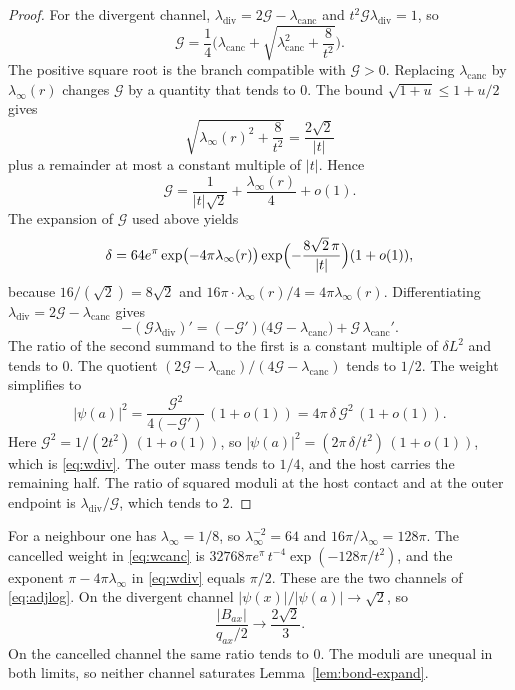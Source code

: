 \begin{proof}
For the divergent channel,
\(\lambda_{\mathrm{div}}=2\mathcal{G}-\lambda_{\mathrm{canc}}\) and
\(t^2\mathcal{G}\lambda_{\mathrm{div}}=1\), so
\[
\mathcal{G}
=\frac14\Biggl(
\lambda_{\mathrm{canc}}
+\sqrt{\lambda_{\mathrm{canc}}^2+\frac{8}{t^2}}
\Biggr).
\]
The positive square root is the branch compatible with \(\mathcal{G}>0\).
Replacing \(\lambda_{\mathrm{canc}}\) by \(\lambda_\infty(r)\) changes
\(\mathcal{G}\) by a quantity that tends to \(0\).
The bound \(\sqrt{1+u}\le 1+u/2\) gives
\[
\sqrt{\lambda_\infty(r)^2+\frac{8}{t^2}}
=\frac{2\sqrt{2}}{|t|}
\]
plus a remainder at most a constant multiple of \(|t|\).
Hence
\[
\mathcal{G}
=\frac{1}{|t|\sqrt{2}}+\frac{\lambda_\infty(r)}{4}+o(1).
\]
The expansion of \(\mathcal{G}\) used above yields
\[
\delta
=64 e^{\pi}
\exp\bigl(-4\pi\lambda_\infty(r)\bigr)
\exp\Bigl(-\frac{8\sqrt{2}\,\pi}{|t|}\Bigr)
(1+o(1)),
\]
because \(16/(\sqrt{2})=8\sqrt{2}\) and
\(16\pi\cdot\lambda_\infty(r)/4=4\pi\lambda_\infty(r)\).
Differentiating \(\lambda_{\mathrm{div}}=2\mathcal{G}-\lambda_{\mathrm{canc}}\)
gives
\[
-(\mathcal{G}\lambda_{\mathrm{div}})'
=(-\mathcal{G}')\bigl(4\mathcal{G}-\lambda_{\mathrm{canc}}\bigr)
+\mathcal{G}\,\lambda_{\mathrm{canc}}'.
\]
The ratio of the second summand to the first is a constant multiple of
\(\delta L^2\) and tends to \(0\).
The quotient
\((2\mathcal{G}-\lambda_{\mathrm{canc}})/(4\mathcal{G}-\lambda_{\mathrm{canc}})\)
tends to \(1/2\).
The weight simplifies to
\[
|\psi(a)|^2
=\frac{\mathcal{G}^2}{4(-\mathcal{G}')}\,(1+o(1))
=4\pi\,\delta\,\mathcal{G}^2\,(1+o(1)).
\]
Here \(\mathcal{G}^2=1/(2t^2)\,(1+o(1))\), so
\(|\psi(a)|^2=(2\pi\,\delta/t^2)\,(1+o(1))\),
which is \eqref{eq:wdiv}.
The outer mass tends to \(1/4\), and the host carries the remaining half.
The ratio of squared moduli at the host contact and at the outer endpoint
is \(\lambda_{\mathrm{div}}/\mathcal{G}\), which tends to \(2\).
\end{proof}

For a neighbour one has \(\lambda_\infty=1/8\), so
\(\lambda_\infty^{-2}=64\) and \(16\pi/\lambda_\infty=128\pi\).
The cancelled weight in \eqref{eq:wcanc} is
\(32768\pi e^{\pi}\, t^{-4}\exp(-128\pi/t^2)\), and the exponent
\(\pi-4\pi\lambda_\infty\) in \eqref{eq:wdiv} equals \(\pi/2\).
These are the two channels of \eqref{eq:adjlog}.
On the divergent channel
\(|\psi(x)|/|\psi(a)|\to\sqrt{2}\), so
\[
\frac{|B_{ax}|}{q_{ax}/2}\to\frac{2\sqrt{2}}{3}.
\]
On the cancelled channel the same ratio tends to \(0\).
The moduli are unequal in both limits, so neither channel saturates
Lemma~\ref{lem:bond-expand}.

